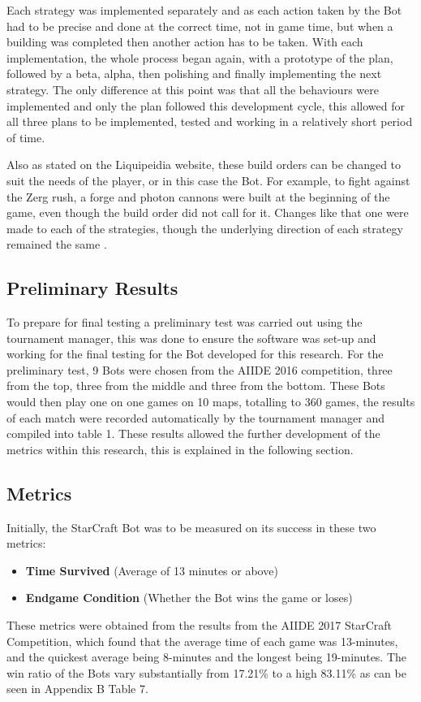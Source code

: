 \documentclass[journal]{IEEEtran}
\begin{document}
	Each strategy was implemented separately and as each action taken by the Bot had to be precise and done at the correct time, not in game time, but when a building was completed then another action has to be taken. With each implementation, the whole process began again, with a prototype of the plan, followed by a beta, alpha, then polishing and finally implementing the next strategy. The only difference at this point was that all the behaviours were implemented and only the plan followed this development cycle, this allowed for all three plans to be implemented, tested and working in a relatively short period of time.
	
	Also as stated on the Liquipeidia website, these build orders can be changed to suit the needs of the player, or in this case the Bot. For example, to fight against the Zerg rush, a forge and photon cannons were built at the beginning of the game, even though the build order did not call for it. Changes like that one were made to each of the strategies, though the underlying direction of each strategy remained the same \cite{Alter}.
	
	\subsection{Preliminary Results}
	To prepare for final testing a preliminary test was carried out using the tournament manager, this was done to ensure the software was set-up and working for the final testing for the Bot developed for this research. For the preliminary test, 9 Bots were chosen from the AIIDE 2016 competition, three from the top, three from the middle and three from the bottom. These Bots would then play one on one games on 10 maps, totalling to 360 games, the results of each match were recorded automatically by the tournament manager and compiled into table 1. These results allowed the further development of the metrics within this research, this is explained in the following section.

	\subsection{Metrics}
	
	Initially, the StarCraft Bot was to be measured on its success in these two metrics:
	\begin{itemize}
		\item \textbf{Time Survived} (Average of 13 minutes or above)
		\item \textbf{Endgame Condition} (Whether the Bot wins the game or loses)
	\end{itemize}
	These metrics were obtained from the results from the AIIDE 2017 StarCraft Competition, which found that the average time of each game was 13-minutes, and the quickest average being 8-minutes and the longest being 19-minutes. The win ratio of the Bots vary substantially from 17.21\% to a high 83.11\% as can be seen in Appendix B Table 7. 
	
\end{document}

